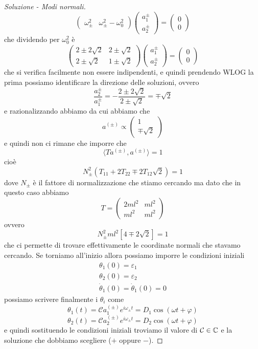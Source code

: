 \documentclass[11pt]{scrartcl}
\begin{document}
\begin{sol}
\begin{proof}[Soluzione - Modi normali]
$$\begin{pmatrix}
				\omega_\pm^2 & \omega_\pm^2-\omega_0^2
			\end{pmatrix}
			\begin{pmatrix}
				a_1^\pm \\
				a_2^\pm 
			\end{pmatrix}=\begin{pmatrix}
			0 \\
			0
			\end{pmatrix}
			$$
			che dividendo per $\omega_0^2$ è
			$$
			\begin{pmatrix}
				2\pm2\sqrt{2} & 2\pm \sqrt{2} \\
				2\pm \sqrt{2} & 1\pm\sqrt{2}
			\end{pmatrix}
			\begin{pmatrix}
				a_1^\pm \\
				a_2^\pm 
			\end{pmatrix}=\begin{pmatrix}
				0 \\
				0
			\end{pmatrix}
			$$
			che si verifica facilmente non essere indipendenti, e quindi prendendo WLOG la prima possiamo identificare la direzione delle soluzioni, ovvero
			$$\frac{a_2^\pm}{a_1^\pm}=-\frac{2\pm 2\sqrt{2}}{2\pm \sqrt{2}}=\mp \sqrt{2}$$
			e razionalizzando abbiamo da cui abbiamo che 
			$$a^{(\pm)}\propto\begin{pmatrix}
				1 \\
				\mp\sqrt{2}
			\end{pmatrix}$$
			e quindi non ci rimane che imporre che 
			$$\langle Ta^{(\pm)},a^{(\pm)}\rangle=1$$
			cioè
			$$N_{\pm}^2\left(T_{11}+2T_{22}\mp 2T_{12}\sqrt{2}\right)=1$$
			dove $N_\pm$ è il fattore di normalizzazione che stiamo cercando ma dato che in questo caso abbiamo
			$$T=\begin{pmatrix}
				2ml^2 & ml^2 \\
				ml^2 & ml^2
			\end{pmatrix}$$
			ovvero
			$$N_\pm^2ml^2\left[4\mp 2\sqrt{2}\right]=1$$
			che ci permette di trovare effettivamente le coordinate normali che stavamo cercando. Se torniamo all'inizio allora possiamo imporre le condizioni iniziali
			\begin{gather*}
				\theta_1(0)=\varepsilon_1 \\
				\theta_2(0)=\varepsilon_2 \\
				\dot{\theta}_1(0)=\dot{\theta}_1(0)=0
			\end{gather*}
			possiamo scrivere finalmente i $\theta_i$ come
			$$\theta_1(t)=\mathcal{C}a_1^{(\pm)}e^{i\omega_\pm t}=D_1\cos(\omega t+\varphi)$$
			$$\theta_2(t)=\mathcal{C}a_2^{(\pm)}e^{i\omega_\pm t}=D_2\cos(\omega t+\varphi)$$
			e quindi sostituendo le condizioni iniziali troviamo il valore di $\mathcal{C}\in\mathbb C$ e la soluzione che dobbiamo scegliere ($+$ oppure $-$).
		\end{proof}
	\end{sol}
\end{document}
